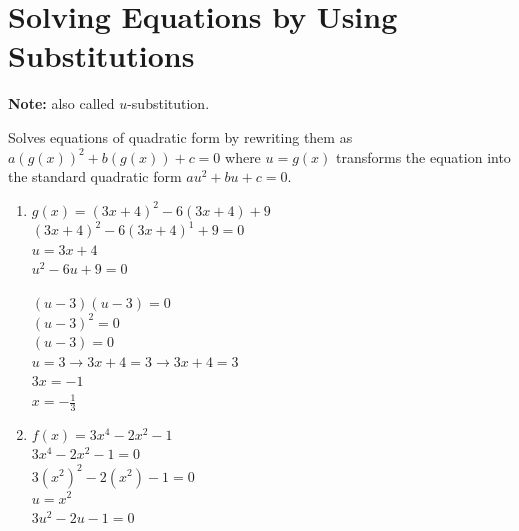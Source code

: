\section{Solving Equations by Using Substitutions}
\textbf{Note: }also called $u$-substitution.
\begin{definition}[$u$-substitution]
  Solves equations of quadratic form by rewriting them as $a(g(x))^2 + b(g(x)) + c = 0$ where $u = g(x)$ transforms the equation into the standard quadratic form $au^2 + bu + c = 0$.
\end{definition}
\begin{example}[Equations]
  \hfill
  \begin{enumerate}
  \item $g(x) = (3x + 4)^2 - 6(3x + 4) + 9$ \\
    $(3x + 4)^2 - 6(3x + 4)^1 + 9 = 0$ \\
    $u = 3x + 4$ \\
    $u^2 - 6u + 9 = 0$ \\
    \begin{center}
    \end{center}
    $(u - 3) (u - 3) = 0$ \\
    $(u - 3)^2 = 0$ \\
    $(u - 3)  = 0$ \\
    $u = 3 \to 3x + 4 = 3 \to 3x + 4 = 3$ \\
    $3x = -1$ \\
    $x = -\frac{1}{3}$
  \item $f(x) = 3x^4 - 2x^2 - 1$ \\
    $3x^4 - 2x^2 - 1 = 0$ \\
    $3(x^2)^2 - 2(x^2) - 1 = 0$ \\
    $u = x^2$ \\
    $3u^2 - 2u - 1 = 0$ \\
    \begin{center}
\end{center}
\end{enumerate}
\end{example}
